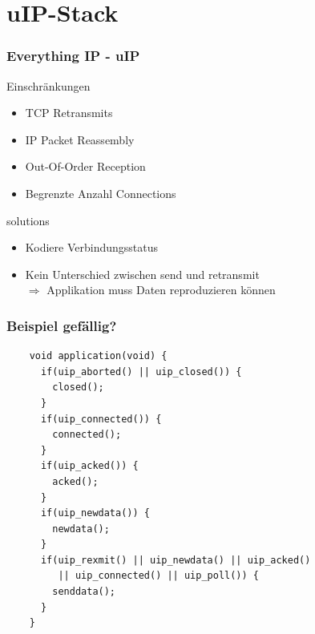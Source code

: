 \documentclass[utf8, xcolor=dvipsnames]{beamer}
\begin{document}
\section{uIP-Stack}
\begin{frame}
  \frametitle{Everything IP - uIP}
  
  \begin{block}{Einschränkungen}
    
    \begin{itemize}
    \item TCP Retransmits
    \item IP Packet Reassembly
    \item Out-Of-Order Reception
    \item Begrenzte Anzahl Connections
    \end{itemize}

  \end{block}

  
  \begin{block}{solutions}
    
    \begin{itemize}
    \item Kodiere Verbindungsstatus
    \item Kein Unterschied zwischen send und retransmit \\
      $\Rightarrow$ Applikation muss Daten reproduzieren können
    \end{itemize}

  \end{block}

\end{frame}


\begin{frame}[fragile]
  \frametitle{Beispiel gefällig?}
  \small{\begin{verbatim}
    void application(void) {
      if(uip_aborted() || uip_closed()) {
        closed();
      }
      if(uip_connected()) {
        connected();
      }
      if(uip_acked()) {
        acked();
      }
      if(uip_newdata()) {
        newdata();
      }
      if(uip_rexmit() || uip_newdata() || uip_acked() 
         || uip_connected() || uip_poll()) {
        senddata();
      }
    }
  \end{verbatim}}

\end{frame}
\end{document}

